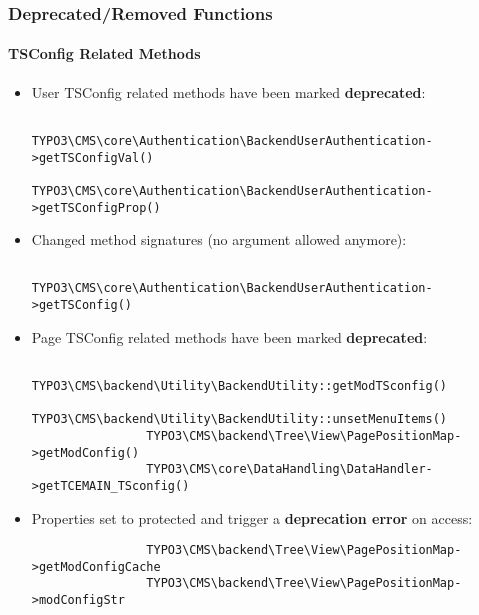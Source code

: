 
\begin{frame}[fragile]
	\frametitle{Deprecated/Removed Functions}
	\framesubtitle{TSConfig Related Methods}

	\lstset{basicstyle=\tiny\ttfamily}

	\begin{itemize}
		\item User TSConfig related methods have been marked \textbf{deprecated}:

			\begin{lstlisting}
				TYPO3\CMS\core\Authentication\BackendUserAuthentication->getTSConfigVal()
				TYPO3\CMS\core\Authentication\BackendUserAuthentication->getTSConfigProp()
			\end{lstlisting}

		\item Changed method signatures (no argument allowed anymore):

			\begin{lstlisting}
				TYPO3\CMS\core\Authentication\BackendUserAuthentication->getTSConfig()
			\end{lstlisting}

		\item Page TSConfig related methods have been marked \textbf{deprecated}:

			\begin{lstlisting}
				TYPO3\CMS\backend\Utility\BackendUtility::getModTSconfig()
				TYPO3\CMS\backend\Utility\BackendUtility::unsetMenuItems()
				TYPO3\CMS\backend\Tree\View\PagePositionMap->getModConfig()
				TYPO3\CMS\core\DataHandling\DataHandler->getTCEMAIN_TSconfig()
			\end{lstlisting}

		\item Properties set to protected and trigger a \textbf{deprecation error} on access:

			\begin{lstlisting}
				TYPO3\CMS\backend\Tree\View\PagePositionMap->getModConfigCache
				TYPO3\CMS\backend\Tree\View\PagePositionMap->modConfigStr
			\end{lstlisting}

	\end{itemize}

\end{frame}


